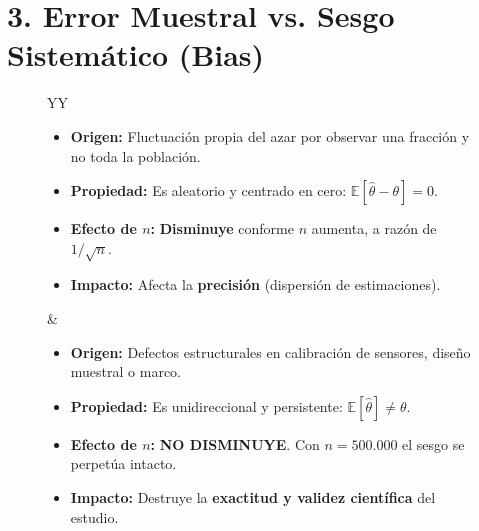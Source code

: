 \documentclass[11pt,a4paper]{article}
\begin{document}
\vspace{0.2cm}

\section*{3. Error Muestral vs. Sesgo Sistemático (Bias)}

\begin{figure}[h!]
\centering
\small
\begin{tabularx}{\linewidth}{YY}
\begin{tcolorbox}[colback=blue!3!white,colframe=azulMedio,title=\textbf{Error Muestral ($\epsilon = \hat{\theta} - \theta$)}]
\begin{itemize}[leftmargin=*,noitemsep]
  \item \textbf{Origen:} Fluctuación propia del azar por observar una fracción y no toda la población.
  \item \textbf{Propiedad:} Es aleatorio y centrado en cero: $\mathbb{E}[\hat{\theta} - \theta] = 0$.
  \item \textbf{Efecto de $n$:} \textbf{Disminuye} conforme $n$ aumenta, a razón de $1/\sqrt{n}$.
  \item \textbf{Impacto:} Afecta la \textbf{precisión} (dispersión de estimaciones).
\end{itemize}
\end{tcolorbox}
&
\begin{tcolorbox}[colback=red!3!white,colframe=rojoAlerta,title=\textbf{Sesgo Sistemático ($Bias = \mathbb{E}[\hat{\theta}] - \theta$)}]
\begin{itemize}[leftmargin=*,noitemsep]
  \item \textbf{Origen:} Defectos estructurales en calibración de sensores, diseño muestral o marco.
  \item \textbf{Propiedad:} Es unidireccional y persistente: $\mathbb{E}[\hat{\theta}] \neq \theta$.
  \item \textbf{Efecto de $n$:} \textbf{NO DISMINUYE}. Con $n = 500.000$ el sesgo se perpetúa intacto.
  \item \textbf{Impacto:} Destruye la \textbf{exactitud y validez científica} del estudio.
\end{itemize}
\end{tcolorbox}
\end{tabularx}
\end{figure}
\end{document}
